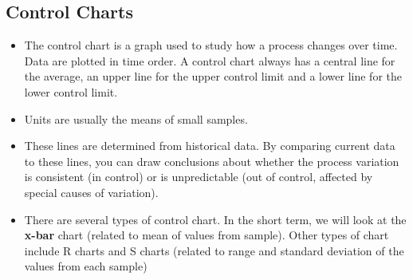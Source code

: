 \documentclass[]{report}
\begin{document}
\subsection{Control Charts}
{\large
	\begin{itemize}
		\item The control chart is a graph used to study how a process changes over time. Data are plotted in time order. A control chart always has a central line for the average, an upper line for the upper control limit and a lower line for the lower control limit. 
		\item Units are usually the means of small samples.
		\item These lines are determined from historical data. By comparing current data to these lines, you can draw conclusions about whether the process variation is consistent (in control) or is unpredictable (out of control, affected by special causes of variation).
		
		
		\item There are several types of control chart. In the short term, we will look at the \textbf{x-bar} chart (related to mean of values from sample).
		Other types of chart include R charts and S charts (related to range and standard deviation of the values from each sample)
	\end{itemize}
}
\end{document}
